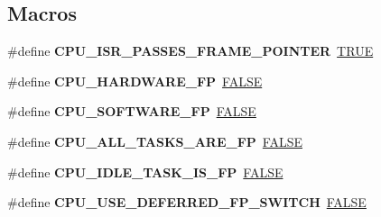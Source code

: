 \subsection*{Macros}
\begin{DoxyCompactItemize}
\item 
\mbox{\label{group__RTEMSScoreCPUEpiphany_ga30c4d320f85b1383c5059da5b19b164a}} 
\#define {\bfseries C\+P\+U\+\_\+\+I\+S\+R\+\_\+\+P\+A\+S\+S\+E\+S\+\_\+\+F\+R\+A\+M\+E\+\_\+\+P\+O\+I\+N\+T\+ER}~\mbox{\hyperlink{group__RTEMSScoreBaseDefs_gaa8cecfc5c5c054d2875c03e77b7be15d}{T\+R\+UE}}
\item 
\mbox{\label{group__RTEMSScoreCPUEpiphany_ga112f88f13afe8bb8f1b13f1ca7e09b8d}} 
\#define {\bfseries C\+P\+U\+\_\+\+H\+A\+R\+D\+W\+A\+R\+E\+\_\+\+FP}~\mbox{\hyperlink{group__RTEMSScoreBaseDefs_gaa93f0eb578d23995850d61f7d61c55c1}{F\+A\+L\+SE}}
\item 
\mbox{\label{group__RTEMSScoreCPUEpiphany_ga304f78c61edce38bb88e909f90a326dc}} 
\#define {\bfseries C\+P\+U\+\_\+\+S\+O\+F\+T\+W\+A\+R\+E\+\_\+\+FP}~\mbox{\hyperlink{group__RTEMSScoreBaseDefs_gaa93f0eb578d23995850d61f7d61c55c1}{F\+A\+L\+SE}}
\item 
\mbox{\label{group__RTEMSScoreCPUEpiphany_ga225de03a8647bf307a73cf907969778d}} 
\#define {\bfseries C\+P\+U\+\_\+\+A\+L\+L\+\_\+\+T\+A\+S\+K\+S\+\_\+\+A\+R\+E\+\_\+\+FP}~\mbox{\hyperlink{group__RTEMSScoreBaseDefs_gaa93f0eb578d23995850d61f7d61c55c1}{F\+A\+L\+SE}}
\item 
\mbox{\label{group__RTEMSScoreCPUEpiphany_gaf1c906c8ee4c3d012dc456285e42d3ee}} 
\#define {\bfseries C\+P\+U\+\_\+\+I\+D\+L\+E\+\_\+\+T\+A\+S\+K\+\_\+\+I\+S\+\_\+\+FP}~\mbox{\hyperlink{group__RTEMSScoreBaseDefs_gaa93f0eb578d23995850d61f7d61c55c1}{F\+A\+L\+SE}}
\item 
\mbox{\label{group__RTEMSScoreCPUEpiphany_ga155bcf88149016c6c58f30eeab9f1598}} 
\#define {\bfseries C\+P\+U\+\_\+\+U\+S\+E\+\_\+\+D\+E\+F\+E\+R\+R\+E\+D\+\_\+\+F\+P\+\_\+\+S\+W\+I\+T\+CH}~\mbox{\hyperlink{group__RTEMSScoreBaseDefs_gaa93f0eb578d23995850d61f7d61c55c1}{F\+A\+L\+SE}}
\item 

\end{DoxyCompactItemize}
